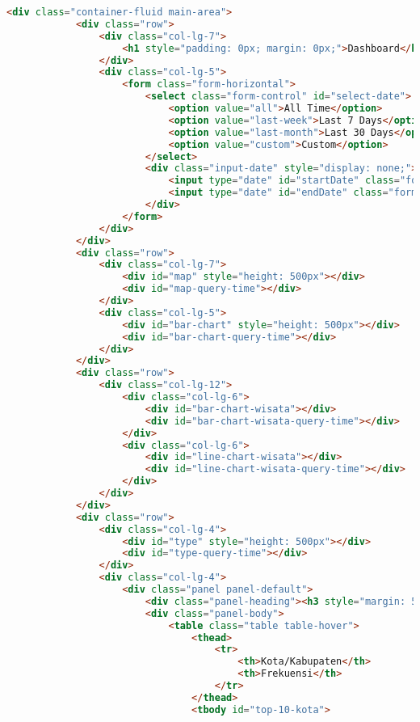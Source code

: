 \begin{lstlisting}[language=HTML,basicstyle=\tiny,caption=index.html]
        <div class="container-fluid main-area">
            <div class="row">
                <div class="col-lg-7">
                    <h1 style="padding: 0px; margin: 0px;">Dashboard</h1>
                </div>
                <div class="col-lg-5">
                    <form class="form-horizontal">
                        <select class="form-control" id="select-date">
                            <option value="all">All Time</option>
                            <option value="last-week">Last 7 Days</option>
                            <option value="last-month">Last 30 Days</option>
                            <option value="custom">Custom</option>
                        </select>
                        <div class="input-date" style="display: none;">
                            <input type="date" id="startDate" class="form-control" value="2016-01-01" style="width: 50%; float: left;">
                            <input type="date" id="endDate" class="form-control" value="2016-06-01" style="width: 50%;  float: left;">
                        </div>
                    </form>
                </div>
            </div>
            <div class="row">
                <div class="col-lg-7">
                    <div id="map" style="height: 500px"></div>
                    <div id="map-query-time"></div>
                </div>
                <div class="col-lg-5">
                    <div id="bar-chart" style="height: 500px"></div>
                    <div id="bar-chart-query-time"></div>
                </div>
            </div>
            <div class="row">
                <div class="col-lg-12">
                    <div class="col-lg-6">
                        <div id="bar-chart-wisata"></div>
                        <div id="bar-chart-wisata-query-time"></div>
                    </div>
                    <div class="col-lg-6">
                        <div id="line-chart-wisata"></div>
                        <div id="line-chart-wisata-query-time"></div>
                    </div>
                </div>
            </div>
            <div class="row">
                <div class="col-lg-4">
                    <div id="type" style="height: 500px"></div>
                    <div id="type-query-time"></div>
                </div>
                <div class="col-lg-4">
                    <div class="panel panel-default">
                        <div class="panel-heading"><h3 style="margin: 5px; font-size: 18px">Top 10 Kota/Kabupaten Wisata</h3></div>
                        <div class="panel-body">
                            <table class="table table-hover">
                                <thead>
                                    <tr>
                                        <th>Kota/Kabupaten</th>
                                        <th>Frekuensi</th>
                                    </tr>
                                </thead>
                                <tbody id="top-10-kota">


\end{lstlisting}
